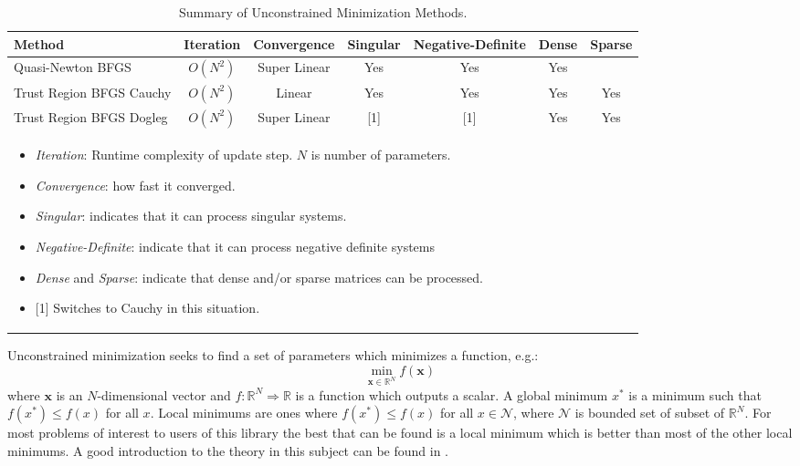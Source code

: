 \documentclass[peerreview,compsoc,onecolumn]{IEEEtran}
\newcommand{\R}{\mathbb{R}}
\begin{document}
\begin{table}[h]
\caption{\label{summary:UM}Summary of Unconstrained Minimization Methods.}
\centering
\begin{tabular}{lcccccc}
Method & Iteration & Convergence & Singular & Negative-Definite & Dense & Sparse \\[1ex]
\hline
Quasi-Newton BFGS        & $O(N^2)$ & Super Linear & Yes & Yes & Yes &  \rule{0pt}{2.6ex} \\
Trust Region BFGS Cauchy & $O(N^2)$ & Linear       & Yes & Yes & Yes & Yes  \\
Trust Region BFGS Dogleg & $O(N^2)$ & Super Linear & [1] & [1] & Yes & Yes  \\[1ex]
\hline
\multicolumn{6}{l}{
\begin{minipage}{0.6\textwidth}
\centering
\vspace{2mm}
\begin{itemize}[leftmargin=*]
\item \emph{Iteration}: Runtime complexity of update step. $N$ is number of parameters.
\item \emph{Convergence}: how fast it converged.
\item \emph{Singular}: indicates that it can process singular systems.
\item \emph{Negative-Definite}: indicate that it can process negative definite systems
\item \emph{Dense} and \emph{Sparse}: indicate that dense and/or sparse matrices can be processed. 
\item {[1]} Switches to Cauchy in this situation.
\end{itemize}
\end{minipage}
 }
\end{tabular}
\end{table}

Unconstrained minimization seeks to find a set of parameters which minimizes a function, e.g.:
\begin{equation}
\min\limits_{\bm{x} \in \R^N} f(\bm{x})
\end{equation}
where $\bm{x}$ is an $N$-dimensional vector and $f : \R^N \Rightarrow \R $ is a function which outputs a scalar. A global minimum $x^*$ is a minimum such that $f(x^*) \le f(x)$ for all $x$. Local minimums are ones where $f(x^*) \le f(x)$ for all $x \in \mathcal{N}$, where $\mathcal{N}$ is bounded set of subset of $\R^N$. For most problems of interest to users of this library the best that can be found is a local minimum which is better than most of the other local minimums. A good introduction to the theory in this subject can be found in \cite{numopt2006}.
\end{document}
